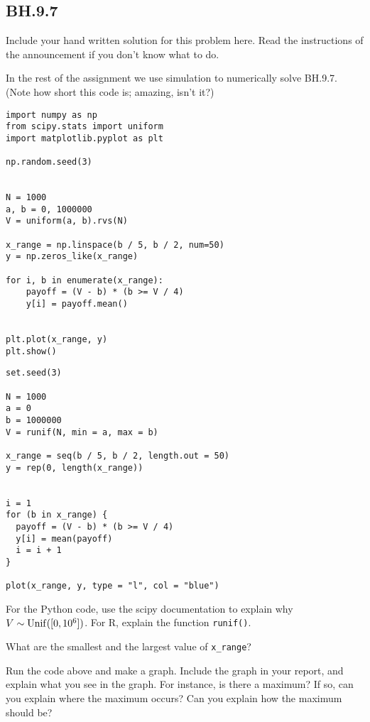 \subsection{BH.9.7}
\label{sec:bh.9.7}


\begin{exercise}
Include your hand written solution for this problem here. Read the instructions of the announcement if you don't know what to do.
\end{exercise}

In the rest of the assignment we use  simulation to numerically solve  BH.9.7. (Note how short  this code is;  amazing, isn't it?)


\begin{verbatim}
import numpy as np
from scipy.stats import uniform
import matplotlib.pyplot as plt

np.random.seed(3)


N = 1000
a, b = 0, 1000000
V = uniform(a, b).rvs(N)

x_range = np.linspace(b / 5, b / 2, num=50)
y = np.zeros_like(x_range)

for i, b in enumerate(x_range):
    payoff = (V - b) * (b >= V / 4)
    y[i] = payoff.mean()


plt.plot(x_range, y)
plt.show()
\end{verbatim}

\begin{verbatim}
set.seed(3)

N = 1000
a = 0
b = 1000000
V = runif(N, min = a, max = b)

x_range = seq(b / 5, b / 2, length.out = 50)
y = rep(0, length(x_range))


i = 1
for (b in x_range) {
  payoff = (V - b) * (b >= V / 4)
  y[i] = mean(payoff)
  i = i + 1
}

plot(x_range, y, type = "l", col = "blue")
\end{verbatim}


\begin{exercise}
For the Python code, use the scipy documentation to explain why $V\sim\mathrm{Unif}([0,10^{6}])$. For R, explain the function \texttt{runif()}.
\end{exercise}



\begin{exercise}
What are the smallest and the largest value of \verb|x_range|?
\end{exercise}

\begin{exercise}
Run the code above and make a graph. Include the graph in your report, and explain what you see in the graph. For instance, is there a maximum? If so, can you explain where the maximum occurs? Can you explain how the maximum should be?
\end{exercise}


